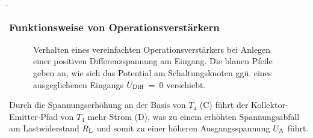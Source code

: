 \begin{frame}
    \b{
        \frametitle{Funktionsweise von Operationsverstärkern}
        \begin{figure}[!h]
            \centering
            \fu{\resizebox{!}{0.7\textheight}{}}
            {Verhalten eines vereinfachten Operationsverstärkers bei Anlegen einer positiven Differenzspannung am Eingang. Die blauen Pfeile geben an, wie sich das Potential am Schaltungsknoten ggü. eines ausgeglichenen Eingangs $U_{\textnormal{Diff}}$~=~0 verschiebt.}
        \end{figure}
        Durch die Spannungserhöhung an der Basis von $T_4$ (C) führt der Kollektor-\linebreak Emitter-Pfad von $T_4$ mehr Strom (D), was zu einem erhöhten Spannungsabfall am Lastwiderstand $R_{\textnormal{L}}$ und somit zu einer höheren Ausgangsspannung $U_{\textnormal{A}}$ führt.}

\end{frame}

